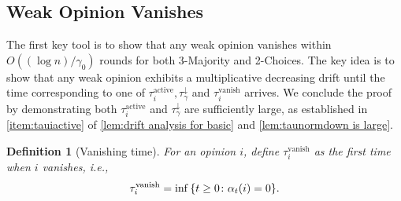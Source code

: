 \documentclass[letterpaper,11pt]{article}
\newtheorem{definition}[theorem]{Definition}
\newcommand{\alphanorm}{\gamma}
\newcommand{\taunormdown}{\tau^{\downarrow}_\alphanorm}
\newcommand{\tauivanish}{\tau^{\mathrm{vanish}}_i}
\newcommand{\tauiactive}{\tau^{\mathrm{active}}_i}
\begin{document}
\subsection{Weak Opinion Vanishes} \label{sec:weak opinion vanishes}
The first key tool is to show that any weak opinion vanishes within $ O((\log n)/\alphanorm_0) $ rounds for both 3-Majority and 2-Choices.
The key idea is to show that any weak opinion exhibits a multiplicative decreasing drift until the time corresponding to one of $\tauiactive, \taunormdown$ and $\tauivanish$ arrives.
We conclude the proof by demonstrating both $\tauiactive$ and $\taunormdown$ are sufficiently large, as established in \cref{item:tauiactive} of \cref{lem:drift analysis for basic} and \cref{lem:taunormdown is large}.
%
\begin{definition}[Vanishing time] \label{def:tauivanish}
  For an opinion $ i $, define $ \tauivanish $ as the first time when $ i $ vanishes, i.e.,
  \begin{align*} 
     \tauivanish = \inf\qty{ t \ge 0 \colon \alpha_t(i) = 0 }.
  \end{align*}
\end{definition}
\end{document}

